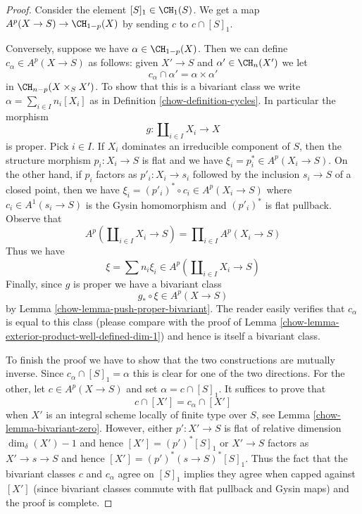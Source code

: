 \begin{proof}

Consider the element $[S]_1 \in \CH_1(S)$. We get a map
$A^p(X \to S) \to \CH_{1 - p}(X)$ by sending $c$ to $c \cap [S]_1$.

\medskip\noindent
Conversely, suppose we have $\alpha \in \CH_{1 - p}(X)$.
Then we can define $c_\alpha \in A^p(X \to S)$ as
follows: given $X' \to S$ and $\alpha' \in \CH_n(X')$
we let
$$
c_\alpha \cap \alpha' = \alpha \times \alpha'
$$
in $\CH_{n - p}(X \times_S X')$. To show that this is a bivariant
class we write $\alpha = \sum_{i \in I} n_i[X_i]$ as in
Definition \ref{chow-definition-cycles}. In particular the morphism
$$
g : \coprod\nolimits_{i \in I} X_i \longrightarrow X
$$
is proper. Pick $i \in I$. If $X_i$ dominates an irreducible component
of $S$, then the structure morphism $p_i : X_i \to S$ is flat and we have
$\xi_i = p_i^* \in A^p(X_i \to S)$. On the other hand, if $p_i$ factors
as $p'_i : X_i \to s_i$ followed by the inclusion $s_i \to S$
of a closed point, then we have
$\xi_i = (p'_i)^* \circ c_i \in A^p(X_i \to S)$
where $c_i \in A^1(s_i \to S)$ is the Gysin homomorphism and
$(p'_i)^*$ is flat pullback. Observe that
$$
A^p(\coprod\nolimits_{i \in I} X_i \to S) =
\prod\nolimits_{i \in I} A^p(X_i \to S)
$$
Thus we have
$$
\xi = \sum n_i \xi_i \in A^p(\coprod\nolimits_{i \in I} X_i \to S)
$$
Finally, since $g$ is proper we have a bivariant class
$$
g_* \circ \xi \in A^p(X \to S)
$$
by Lemma \ref{chow-lemma-push-proper-bivariant}. The reader easily
verifies that $c_\alpha$ is equal to this class
(please compare with the proof of
Lemma \ref{chow-lemma-exterior-product-well-defined-dim-1})
and hence is itself a bivariant class.

\medskip\noindent
To finish the proof we have to show that the two constructions
are mutually inverse. Since $c_\alpha \cap [S]_1 = \alpha$
this is clear for one of the two directions. For the other, let
$c \in A^p(X \to S)$ and set $\alpha = c \cap [S]_1$.
It suffices to prove that
$$
c \cap [X'] = c_\alpha \cap [X']
$$
when $X'$ is an integral scheme locally of finite type over $S$,
see Lemma \ref{chow-lemma-bivariant-zero}. However, either $p' : X' \to S$
is flat of relative dimension $\dim_\delta(X') - 1$ and hence
$[X'] = (p')^*[S]_1$ or $X' \to S$ factors as $X' \to s \to S$
and hence $[X'] = (p')^*(s \to S)^*[S]_1$. Thus the fact that the
bivariant classes $c$ and $c_\alpha$ agree on $[S]_1$
implies they agree when capped against $[X']$ (since bivariant classes
commute with flat pullback and Gysin maps) and the proof is complete.
\end{proof}

